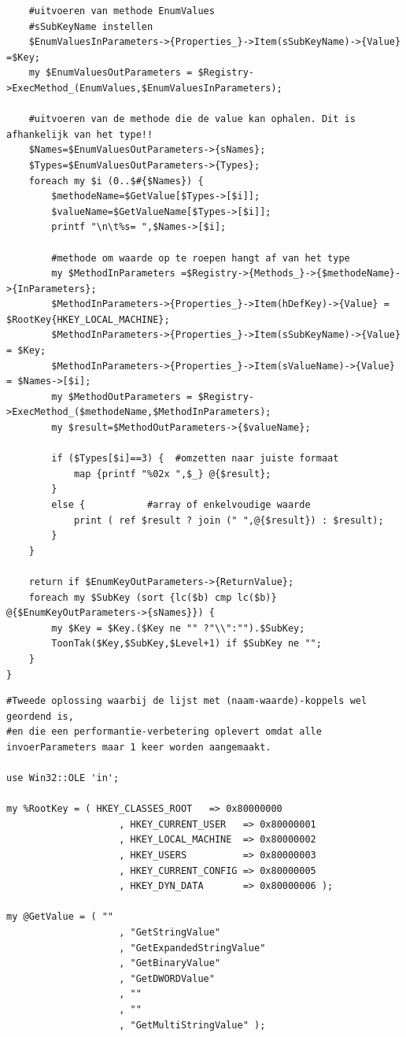 \documentclass[11pt,a4paper]{report}
\begin{document}
\begin{enumerate}[resume]
\begin{lstlisting}
	#uitvoeren van methode EnumValues
	#sSubKeyName instellen
	$EnumValuesInParameters->{Properties_}->Item(sSubKeyName)->{Value} =$Key;
	my $EnumValuesOutParameters = $Registry->ExecMethod_(EnumValues,$EnumValuesInParameters);
	
	#uitvoeren van de methode die de value kan ophalen. Dit is afhankelijk van het type!!
	$Names=$EnumValuesOutParameters->{sNames};
	$Types=$EnumValuesOutParameters->{Types};
	foreach my $i (0..$#{$Names}) {
		$methodeName=$GetValue[$Types->[$i]];
		$valueName=$GetValueName[$Types->[$i]];
		printf "\n\t%s= ",$Names->[$i];
		
		#methode om waarde op te roepen hangt af van het type
		my $MethodInParameters =$Registry->{Methods_}->{$methodeName}->{InParameters};
		$MethodInParameters->{Properties_}->Item(hDefKey)->{Value} = $RootKey{HKEY_LOCAL_MACHINE};
		$MethodInParameters->{Properties_}->Item(sSubKeyName)->{Value} = $Key;
		$MethodInParameters->{Properties_}->Item(sValueName)->{Value} = $Names->[$i];
		my $MethodOutParameters = $Registry->ExecMethod_($methodeName,$MethodInParameters);
		my $result=$MethodOutParameters->{$valueName};
		
		if ($Types[$i]==3) {  #omzetten naar juiste formaat
			map {printf "%02x ",$_} @{$result};
		}
		else {           #array of enkelvoudige waarde
			print ( ref $result ? join (" ",@{$result}) : $result);
		}
	}
	
	return if $EnumKeyOutParameters->{ReturnValue};
	foreach my $SubKey (sort {lc($b) cmp lc($b)} @{$EnumKeyOutParameters->{sNames}}) {
		my $Key = $Key.($Key ne "" ?"\\":"").$SubKey;
		ToonTak($Key,$SubKey,$Level+1) if $SubKey ne "";
	}
}
	\end{lstlisting}
	\begin{lstlisting}
#Tweede oplossing waarbij de lijst met (naam-waarde)-koppels wel geordend is, 
#en die een performantie-verbetering oplevert omdat alle invoerParameters maar 1 keer worden aangemaakt.

use Win32::OLE 'in';

my %RootKey = ( HKEY_CLASSES_ROOT   => 0x80000000
					, HKEY_CURRENT_USER   => 0x80000001
					, HKEY_LOCAL_MACHINE  => 0x80000002
					, HKEY_USERS          => 0x80000003
					, HKEY_CURRENT_CONFIG => 0x80000005
					, HKEY_DYN_DATA       => 0x80000006 );

my @GetValue = ( ""
					, "GetStringValue"
					, "GetExpandedStringValue"
					, "GetBinaryValue"
					, "GetDWORDValue"
					, ""
					, ""
					, "GetMultiStringValue" );               


\end{lstlisting}
\end{enumerate}
\end{document}
